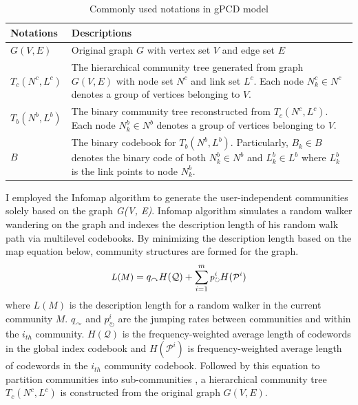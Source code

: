 \begin{table}[h]
	\centering
	
	\begin{tabular}{p{3cm}p{11cm}} 
		\toprule 
		\textbf{Notations} & \textbf{Descriptions} \\ \midrule 
		$G(V,E)$ & Original graph $G$ with vertex set $V$ and edge set $E$ \\ \midrule 
		\textit{$T_{c}(N^{c},L^{c})$} & The hierarchical community tree generated from graph $G(V,E)$ with node set $N^{c}$ and link set $L^{c}$. Each node  $N^{c}_{k} \in N^{c}$ denotes a group of vertices belonging to $V$. \\ \midrule 
		\textit{$T_{b}(N^{b},L^{b})$} & The binary community tree reconstructed from \textit{$T_{c}(N^{c},L^{c})$}. Each node $N^{b}_{k} \in N^{b}$ denotes a group of vertices belonging to $V$. \\ \midrule 
		$B$ & The binary codebook for \textit{$T_{b}(N^{b},L^{b})$}. Particularly, $B_{k} \in B$ denotes the binary code of both $N_{k}^{b} \in N^{b}$ and $L_{k}^{b}\in L^{b}$ where $L_{k}^{b}$ is the link points to node $N_{k}^{b}$.
		\\ \bottomrule
	\end{tabular}
	\caption{Commonly used notations in gPCD model}
	\label{tab:notation}
	\vspace{-1em}
\end{table} 

I employed the Infomap algorithm \cite{rosvall2011multilevel} to generate the user-independent communities solely based on the graph \textit{G(V, E)}. Infomap algorithm simulates a random walker wandering on the graph and indexes the  description length of his random walk path via multilevel codebooks. By minimizing the description length based on the map equation below, community structures are formed for the graph.
\begin{equation} \small
\textit{$L(M)$} = q_{\curvearrowright}H(\mathcal{Q})+\sum_{i=1}^{m} \textit{$p_{\circlearrowright}^{i}$}H(\textit{$\mathcal{P}^{i}$}) 
\end{equation}
where \textit{$L(M)$} is the description length for a random walker in the current community $M$. $q_{\curvearrowright}$ and $p_{\circlearrowright}^{i}$ are the jumping rates between communities and within the $i_{th}$ community. $H(\mathcal{Q})$ is the frequency-weighted average length of codewords in the global index codebook and $H(\mathcal{P}^{i})$ is frequency-weighted average length of codewords in the $i_{th}$ community codebook. Followed by this equation to partition communities into sub-communities , a hierarchical community tree \textit{$T_{c}(N^{c},L^{c})$} is constructed from the original graph $G(V,E)$. 


